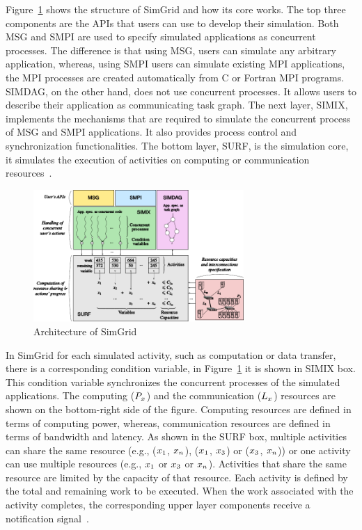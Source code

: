 Figure~\ref{fig:SimGrid} shows the structure of SimGrid and how its core works. The top three components are the APIs that users can use to develop their simulation. Both MSG and SMPI are used to specify simulated applications as concurrent processes. The difference is that using MSG, users can simulate any arbitrary application, whereas, using SMPI users can simulate existing MPI applications, the MPI processes are created automatically from C or Fortran MPI programs. SIMDAG, on the other hand, does not use concurrent processes. It allows users to describe their application as communicating task graph. The next layer, SIMIX, implements the mechanisms that are required to simulate the concurrent process of MSG and SMPI applications. It also provides process control and synchronization functionalities. The bottom layer, SURF, is the simulation core, it simulates the execution of activities on computing or communication resources~\cite{DBLP:journals/jpdc/CasanovaGLQS14}.
\begin{figure}[ht]
	\begin{center}
		\includegraphics[width=8cm]{images/SimGrid.pdf}
		\caption{Architecture of SimGrid \cite{DBLP:journals/jpdc/CasanovaGLQS14}}
		\label{fig:SimGrid}
	\end{center}
\end{figure}

In SimGrid for each simulated activity, such as computation or data transfer, there is a corresponding condition variable, in Figure~\ref{fig:SimGrid} it is shown in SIMIX box. This condition variable synchronizes the concurrent processes of the simulated applications. The computing (\($$P_{x}$$\)) and the communication (\($$L_{x}$$\)) resources are shown on the bottom-right side of the figure. Computing resources are defined in terms of computing power, whereas, communication resources are defined in terms of bandwidth and latency. As shown in the SURF box, multiple activities can share the same resource (e.g., (\($$x_{1}$$\), \($$x_{n}$$\)), (\($$x_{1}$$\), \($$x_{3}$$\)) or (\($$x_{3}$$\), \($$x_{n}$$\))) or one activity can use multiple resources (e.g., \($$x_{1}$$\) or \($$x_{3}$$\) or  \($$x_{n}$$\)). Activities that share the same resource are limited by the capacity of that resource. Each activity is defined by the total and remaining work to be executed. When the work associated with the activity completes, the corresponding upper layer components receive a notification signal~\cite{DBLP:journals/jpdc/CasanovaGLQS14}.

